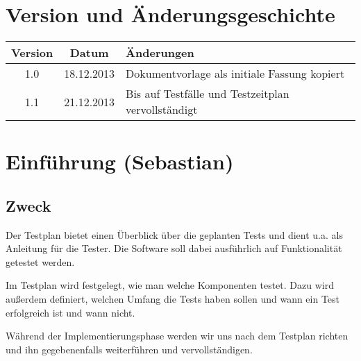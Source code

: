 \documentclass[fontsize=12pt,paper=a4,twoside]{scrartcl}
\begin{document}

\newpage

  \thispagestyle{fancy}
  \fancyhead{}
  \fancyfoot{}
  \renewcommand{\headrulewidth}{0.4pt}
  \tableofcontents

\newpage



\section*{Version und Änderungsgeschichte}
\begin{tabular}{ccl}
Version & Datum & Änderungen \\
\hline
1.0 & 18.12.2013 & Dokumentvorlage als initiale Fassung kopiert \\
1.1 & 21.12.2013 & Bis auf Testfälle und Testzeitplan vervollständigt \\
\end{tabular}


\section{Einführung (Sebastian)}\label{c01}

\subsection{Zweck}
Der Testplan bietet einen Überblick über die geplanten Tests und dient u.a. als Anleitung für die Tester. Die Software soll dabei ausführlich auf Funktionalität getestet werden. 

Im Testplan wird festgelegt, wie man welche Komponenten testet. Dazu wird außerdem definiert, welchen Umfang die Tests haben sollen und wann ein Test erfolgreich ist und wann nicht.

Während der Implementierungsphase werden wir uns nach dem Testplan richten und ihn gegebenenfalls weiterführen und vervollständigen.
\end{document}
